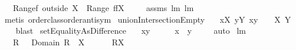 \begin{isabellebody}
\ \ \ {\isachardoublequoteopen}Range{\isacharparenleft}f\ outside\ X{\isacharparenright}\ {\isacharequal}\ {\isacharparenleft}Range\ f{\isacharparenright}{\isacharminus}{\isacharparenleft}f{\isacharbackquote}{\isacharbackquote}X{\isacharparenright}{\isachardoublequoteclose}\ \isanewline
%
\isadelimproof
\ \ %
\endisadelimproof
%
\isatagproof
{}\isamarkupfalse%
\ assms\ lm{}{}{}\ lm{}{}{}\ \isamarkupfalse%
\ {\isacharparenleft}metis\ order{\isacharunderscore}class{\isachardot}order{\isachardot}antisym{\isacharparenright}%
\endisatagproof
{\isafoldproof}%
%
\isadelimproof
\isanewline
%
\endisadelimproof
\isanewline
\isanewline
{}\isamarkupfalse%
\ unionIntersectionEmpty{\isacharcolon}\ \isanewline
\ \ {\isachardoublequoteopen}{\isacharparenleft}{\isasymforall}x{\isasymin}X{\isachardot}\ {\isasymforall}y{\isasymin}Y{\isachardot}\ x{\isasyminter}y\ {\isacharequal}\ {\isacharbraceleft}{\isacharbraceright}{\isacharparenright}\ {\isacharequal}\ {\isacharparenleft}{\isacharparenleft}{\isasymUnion}X{\isacharparenright}{\isasyminter}{\isacharparenleft}{\isasymUnion}\ Y{\isacharparenright}{\isacharequal}{\isacharbraceleft}{\isacharbraceright}{\isacharparenright}{\isachardoublequoteclose}\isanewline
%
\isadelimproof
\ \ %
\endisadelimproof
%
\isatagproof
{}\isamarkupfalse%
\ blast%
\endisatagproof
{\isafoldproof}%
%
\isadelimproof
\isanewline
%
\endisadelimproof
\isanewline
{}\isamarkupfalse%
\ setEqualityAsDifference{\isacharcolon}\ \isanewline
\ \ {\isachardoublequoteopen}{\isacharbraceleft}x{\isacharbraceright}{\isacharminus}{\isacharbraceleft}y{\isacharbraceright}\ {\isacharequal}\ {\isacharbraceleft}{\isacharbraceright}\ \ {\isacharequal}\ \ {\isacharparenleft}x\ {\isacharequal}\ y{\isacharparenright}{\isachardoublequoteclose}\ \isanewline
%
\isadelimproof
\ \ %
\endisadelimproof
%
\isatagproof
{}\isamarkupfalse%
\ auto%
\endisatagproof
{\isafoldproof}%
%
\isadelimproof
\isanewline
%
\endisadelimproof
\isanewline
{}\isamarkupfalse%
\ lm{}{}{}{\isacharcolon}\ \isanewline
\ \ \ {\isachardoublequoteopen}R\ {\isasymnoteq}\ {\isacharbraceleft}{\isacharbraceright}{\isachardoublequoteclose}\ {\isachardoublequoteopen}Domain\ R\ {\isasyminter}\ X\ {\isasymnoteq}\ {\isacharbraceleft}{\isacharbraceright}{\isachardoublequoteclose}\ \isanewline
\ \ \ {\isachardoublequoteopen}R{\isacharbackquote}{\isacharbackquote}X\ {\isasymnoteq}\ {\isacharbraceleft}{\isacharbraceright}{\isachardoublequoteclose}\ \isanewline

\end{isabellebody}
